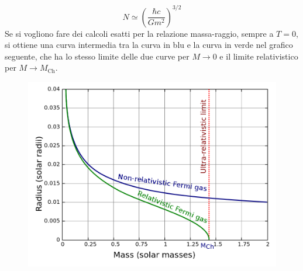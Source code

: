 \documentclass[a4paper,11pt]{article}
\theoremstyle{theorem}
\theoremstyle{definition}
\begin{document}
\begin{itemize}
		\[N\simeq\left(\frac{\hbar c}{Gm^2}\right)^{3/2}\]
		Se si vogliono fare dei calcoli esatti per la relazione massa-raggio, sempre a $T=0$, si ottiene una curva intermedia tra la curva in blu e la curva in verde nel grafico seguente, che ha lo stesso limite delle due curve per $M\to 0$ e il limite relativistico per $M\to M_\textrm{Ch}$.
		\begin{figure}[h!]
			\centering
			\includegraphics[scale=0.4]{chandra.png}
			\label{chandra}
		\end{figure}
	

\end{itemize}
\end{document}
